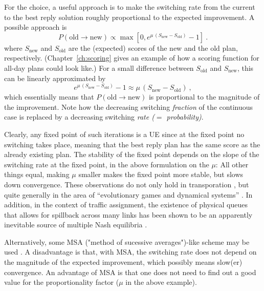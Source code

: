 For the choice, a useful approach is to make the switching rate from
the current to the best reply solution roughly proportional to the
expected improvement. A possible approach is
\begin{equation}
P(\text{old} \to \text{new}) \propto \max[ 0, e^{\mu \, (S_{\text{new}} - S_{\text{old}})} - 1]\ .
\end{equation}
where $S_\text{new}$ and $S_\text{old}$ are the (expected) scores of the new
and the old plan, respectively. (Chapter~\ref{ch:scoring}%
gives an example of how a scoring function for all-day plans could
look like.)  For a small difference between $S_\text{old}$ and $S_\text{new}$,
this can be linearly approximated by
\begin{equation}
e^{\mu \, (S_\text{new} - S_\text{old})} - 1
\approx\mu \,  (S_\text{new} - S_\text{old})\ ,
\end{equation}
which essentially means that $P(\text{old} \to \text{new})$ is proportional to the 
magnitude of the improvement.  Note how
the decreasing switching \emph{fraction} of the continuous case is
replaced by a decreasing switching \emph{rate ($=$ probability)}.

Clearly, any fixed point of such iterations is a UE since at the
fixed point no switching takes place, meaning that the best reply plan
has the same score as the already existing plan.  
%
The stability of the fixed point depends on the slope of the switching
rate at the fixed point, in the above formulation on the $\mu$: All
other things equal, making $\mu$ smaller makes the fixed point more
stable, but slows down convergence. 
%
These observations do not only hold in transporation \citep[e.g.,][]{watling-2003},
but quite generally in the area of ``evolutionary
games and dynamical systems'' \citep{HofbSigmBook}. 
%
In addition, in the context of
traffic assignment, the existence of physical queues that allows for 
spillback across many links has been shown to be an apparently inevitable
source of multiple Nash equilibria \citep[][]{daganzo-1998}.

Alternatively, some MSA ("method of sucessive averages")-like scheme
may be used \citep{liu-2007}.  A disadvantage is that, with MSA, the
switching rate does not depend on the magnitude of the expected
improvement, which possibly means slow(er) convergence.  An advantage
of MSA is that one does not need to find out a good value for the
proportionality factor ($\mu$ in the above example).  

